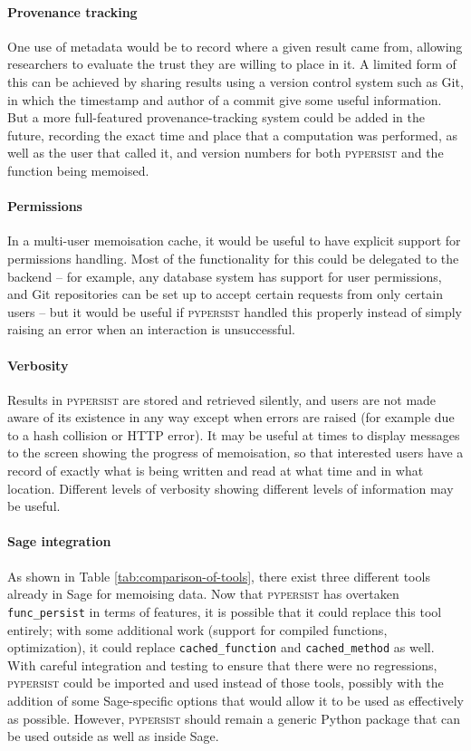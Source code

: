 \documentclass{deliverablereport}
\newcommand{\pypersist}{\textsc{pypersist}}
\begin{document}
\paragraph{Provenance tracking}
One use of metadata would be to record where a given result came from, allowing
researchers to evaluate the trust they are willing to place in it.  A limited
form of this can be achieved by sharing results using a version control system
such as Git, in which the timestamp and author of a commit give some useful
information.  But a more full-featured provenance-tracking system could be added
in the future, recording the exact time and place that a computation was
performed, as well as the user that called it, and version numbers for both
\pypersist{} and the function being memoised.

\paragraph{Permissions}
In a multi-user memoisation cache, it would be useful to have explicit support
for permissions handling.  Most of the functionality for this could be delegated
to the backend -- for example, any database system has support for user
permissions, and Git repositories can be set up to accept certain requests from
only certain users -- but it would be useful if \pypersist{} handled this
properly instead of simply raising an error when an interaction is unsuccessful.

\paragraph{Verbosity}
Results in \pypersist{} are stored and retrieved silently, and users are not
made aware of its existence in any way except when errors are raised (for
example due to a hash collision or HTTP error).  It may be useful at times to
display messages to the screen showing the progress of memoisation, so that
interested users have a record of exactly what is being written and read at what
time and in what location.  Different levels of verbosity showing different
levels of information may be useful.

\paragraph{Sage integration}
As shown in Table \ref{tab:comparison-of-tools}, there exist three different
tools already in Sage for memoising data.  Now that \pypersist{} has overtaken
\texttt{func\_persist} in terms of features, it is possible that it could replace this tool
entirely; with some additional work (support for compiled functions,
optimization), it could replace \texttt{cached\_function} and
\texttt{cached\_method} as well.
With careful integration and testing to ensure that there were no
regressions, \pypersist{} could be imported and used instead of those tools,
possibly with the addition of some Sage-specific options that would allow it to
be used as effectively as possible.  However, \pypersist{} should remain a
generic Python package that can be used outside as well as inside Sage.
\end{document}
